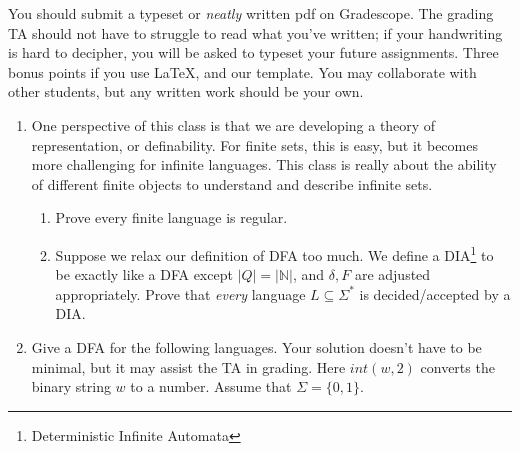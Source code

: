 \documentclass[11pt]{article}
\begin{document}

You should submit a typeset or \emph{neatly} written pdf on Gradescope.  The grading TA should not have to struggle to read what you've written; if your handwriting is hard to decipher, you will be asked to typeset your future assignments. Three bonus points if you use \LaTeX, and our template. You may collaborate with other students, but any written work should be your own. 

\begin{enumerate}

    \item One perspective of this class is that we are developing a theory of representation, or definability. For finite sets, this is easy, but it becomes more challenging for infinite languages. This class is really about the ability of different finite objects to understand and describe infinite sets.

    \begin{enumerate}
        \item Prove every finite language is regular.
        
            \begin{answer}

            \end{answer}
            
        \item Suppose we relax our definition of DFA too much. We define a DIA\footnote{Deterministic Infinite Automata} to be exactly like a DFA except $|Q|=|\mathbb{N}|$, and $\delta, F$ are adjusted appropriately. Prove that \textit{every} language $L \subseteq \Sigma^*$ is decided/accepted by a DIA.
        
            \begin{answer}

            \end{answer}
            
    \end{enumerate}
    
    \item Give a DFA for the following languages. Your solution doesn't have to be minimal, but it may assist the TA in grading. Here $int(w,2)$ converts the binary string $w$ to a number. Assume that $\Sigma= \{0,1\}$. 
    \begin{enumerate}


\end{enumerate}
\end{enumerate}
\end{document}
